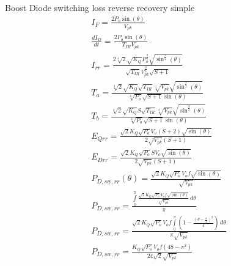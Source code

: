 \documentclass[12pt]{report}
\begin{document}
Boost Diode switching loss reverse recovery simple
\begin{align}
I_{F} = \frac{2 P_{o} \sin{\left(\theta \right)}}{V_{pk}}\\
\frac{dI_{D}}{dt} = \frac{2 P_{o} \sin{\left(\theta \right)}}{T_{IR} V_{pk}}\\
I_{rr} = \frac{2 \sqrt[4]{2} \sqrt{K_{Q}} P_{o}^{\frac{3}{4}} \sqrt{\sin^{\frac{3}{2}}{\left(\theta \right)}}}{\sqrt{T_{IR}} V_{pk}^{\frac{3}{4}} \sqrt{S + 1}}\\
T_{a} = \frac{\sqrt[4]{2} \sqrt{K_{Q}} \sqrt{T_{IR}} \sqrt[4]{V_{pk}} \sqrt{\sin^{\frac{3}{2}}{\left(\theta \right)}}}{\sqrt[4]{P_{o}} \sqrt{S + 1} \sin{\left(\theta \right)}}\\
T_{b} = \frac{\sqrt[4]{2} \sqrt{K_{Q}} S \sqrt{T_{IR}} \sqrt[4]{V_{pk}} \sqrt{\sin^{\frac{3}{2}}{\left(\theta \right)}}}{\sqrt[4]{P_{o}} \sqrt{S + 1} \sin{\left(\theta \right)}}\\
E_{Qrr} = \frac{\sqrt{2} K_{Q} \sqrt{P_{o}} V_{o} \left(S + 2\right) \sqrt{\sin{\left(\theta \right)}}}{2 \sqrt{V_{pk}} \left(S + 1\right)}\\
E_{Drr} = \frac{\sqrt{2} K_{Q} \sqrt{P_{o}} S V_{o} \sqrt{\sin{\left(\theta \right)}}}{2 \sqrt{V_{pk}} \left(S + 1\right)}\\
P_{D,sw,rr}(\theta) = \frac{\sqrt{2} K_{Q} \sqrt{P_{o}} V_{o} f \sqrt{\sin{\left(\theta \right)}}}{\sqrt{V_{pk}}}\\
P_{D,sw,rr} = \frac{\int\limits_{0}^{\pi} \frac{\sqrt{2} K_{Q} \sqrt{P_{o}} V_{o} f \sqrt{\sin{\left(\theta \right)}}}{\sqrt{V_{pk}}}\, d\theta}{\pi}\\
P_{D,sw,rr} = \frac{\sqrt{2} K_{Q} \sqrt{P_{o}} V_{o} f \int\limits_{0}^{\pi} \left(1 - \frac{\left(\theta - \frac{\pi}{2}\right)^{2}}{4}\right)\, d\theta}{\pi \sqrt{V_{pk}}}\\
P_{D,sw,rr} = \frac{K_{Q} \sqrt{P_{o}} V_{o} f \left(48 - \pi^{2}\right)}{24 \sqrt{2} \sqrt{V_{pk}}}\\
\end{align}
\end{document}
